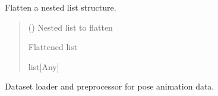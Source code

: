 \documentclass[letterpaper,10pt,english]{sphinxmanual}
\begin{document}
\begin{fulllineitems}
\label{\detokenize{autoapi/src/DataLoader/index:src.DataLoader.flatten}}
\pysigstartsignatures
\pysiglinewithargsret
{}
{}
{}
\pysigstopsignatures
\sphinxAtStartPar
Flatten a nested list structure.
\begin{quote}\begin{description}
\sphinxAtStartPar
{} (\sphinxstyleliteralemphasis{\sphinxupquote{{[}}}\sphinxstyleliteralemphasis{\sphinxupquote{{[}}}\sphinxstyleliteralemphasis{\sphinxupquote{{]}}}\sphinxstyleliteralemphasis{\sphinxupquote{{]}}}) \textendash{} Nested list to flatten

\sphinxAtStartPar
Flattened list

\sphinxAtStartPar
list{[}Any{]}

\end{description}\end{quote}

\end{fulllineitems}


\begin{fulllineitems}
\label{\detokenize{autoapi/src/DataLoader/index:src.DataLoader.DataLoader}}
\pysigstartsignatures
\pysiglinewithargsret
{}
{\sphinxparamcomma {}}
{}
\pysigstopsignatures
\end{fulllineitems}


\sphinxAtStartPar
Dataset loader and preprocessor for pose animation data.

\begin{fulllineitems}
\label{\detokenize{autoapi/src/DataLoader/index:src.DataLoader.__dataset_path}}
\pysigstartsignatures
\pysigline
{}
\pysigstopsignatures
\end{fulllineitems}
\end{document}
